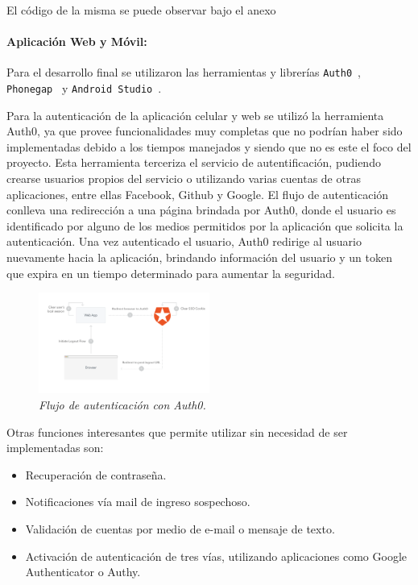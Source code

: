 El código de la misma se puede observar bajo el anexo~


\paragraph{Aplicación Web y Móvil:}

Para el desarrollo final se utilizaron las herramientas y librerías \lstinline[columns=fixed]{Auth0}~\cite{Auth0}, \lstinline[columns=fixed]{Phonegap}~\cite{Phonegap} y \lstinline[columns=fixed]{Android Studio}~\cite{AndroidStudio}.

Para la autenticación de la aplicación celular y web se utilizó la herramienta Auth0, ya que provee funcionalidades muy completas que no podrían haber sido implementadas debido a los tiempos manejados y siendo que no es este el foco del proyecto.
Esta herramienta terceriza el servicio de autentificación, pudiendo crearse usuarios propios del servicio o utilizando varias cuentas de otras aplicaciones, entre ellas Facebook, Github y Google.
El flujo de autenticación conlleva una redirección a una página brindada por Auth0, donde el usuario es identificado por alguno de los medios permitidos por la aplicación que solicita la autenticación.
Una vez autenticado el usuario, Auth0 redirige al usuario nuevamente hacia la aplicación, brindando información del usuario y un token que expira en un tiempo determinado para aumentar la seguridad.

\begin{figure}[H]
  \centering
  \includegraphics[width=0.5\textwidth, keepaspectratio]{images/auth0}
  \caption{\textit{Flujo de autenticación con Auth0.}}
  \label{fig:auth0-flow}
\end{figure}

Otras funciones interesantes que permite utilizar sin necesidad de ser implementadas son:

\begin{itemize}
  \item Recuperación de contraseña.
  \item Notificaciones vía mail de ingreso sospechoso.
  \item Validación de cuentas por medio de e-mail o mensaje de texto.
  \item Activación de autenticación de tres vías, utilizando aplicaciones como Google Authenticator o Authy.
\end{itemize}

